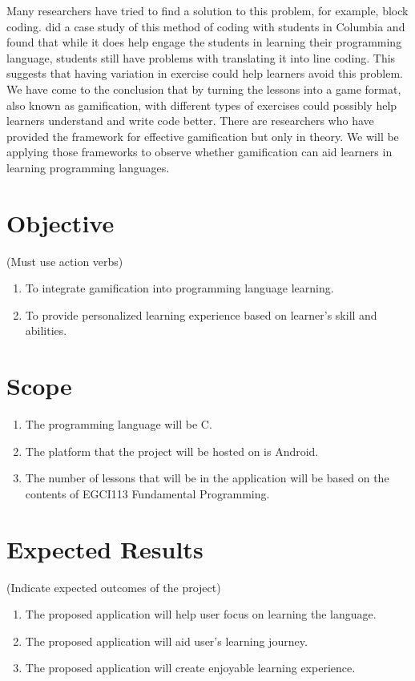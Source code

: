 Many researchers have tried to find a solution to this problem, for example, block coding. \citet{BlockCode} did a case study of this method of coding with students in Columbia and found that while it does help engage the students in learning their programming language, students still have problems with translating it into line coding. This suggests that having variation in exercise could help learners avoid this problem. We have come to the conclusion that by turning the lessons into a game format, also known as gamification, with different types of exercises could possibly help learners understand and write code better. There are researchers who have provided the framework for effective gamification but only in theory. We will be applying those frameworks to observe whether gamification can aid learners in learning programming languages.

\section{Objective}
\noindent\hspace{1.5em}(Must use action verbs)
\begin{enumerate}
	\item To integrate gamification into programming language learning.
	\item To provide personalized learning experience based on learner's skill and abilities.
\end{enumerate}

\section{Scope}
\begin{enumerate}
    \item The programming language will be C.
    \item The platform that the project will be hosted on is Android.
    \item The number of lessons that will be in the application will be based on the contents of EGCI113 Fundamental Programming.
\end{enumerate}

\section{Expected Results}
\noindent\hspace{1.5em}(Indicate expected outcomes of the project)
\begin{enumerate}
	\item The proposed application will help user focus on learning the language.
	\item The proposed application will aid user's learning journey.
	\item The proposed application will create enjoyable learning experience.
\end{enumerate}

